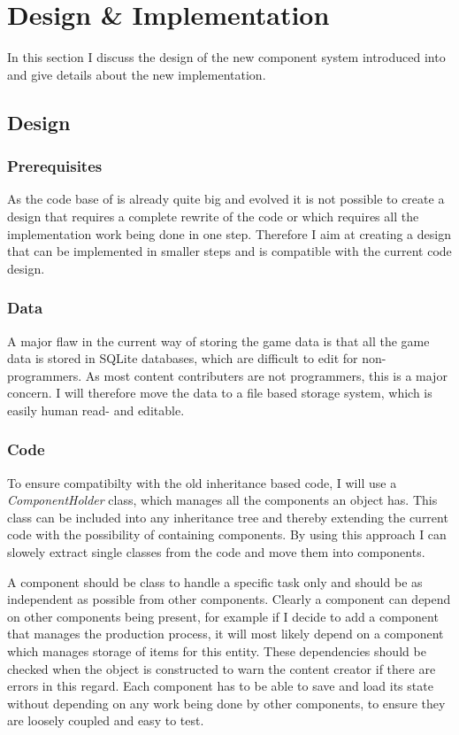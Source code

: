 \section{Design \& Implementation}
In this section I discuss the design of the new component system introduced into \UH{} and give details about the new
implementation.

\subsection{Design}

\subsubsection{Prerequisites}
As the code base of \UH{} is already quite big and evolved it is not possible to create a design that requires a
complete rewrite of the code or which requires all the implementation work being done in one step. Therefore I aim at
creating a design that can be implemented in smaller steps and is compatible with the current code design.

\subsubsection{Data}
A major flaw in the current \UH{} way of storing the game data is that all the game data is stored in SQLite databases,
which are difficult to edit for non-programmers. As most content contributers are not programmers, this is a major
concern. I will therefore move the data to a file based storage system, which is easily human read- and editable.

\subsubsection{Code}
To ensure compatibilty with the old inheritance based code, I will use a \textit{ComponentHolder} class, which manages all the
components an object has. This class can be included into any inheritance tree and thereby extending the current code
with the possibility of containing components. By using this approach I can slowely extract single classes from the code
and move them into components.

A component should be class to handle a specific task only and should be as independent
as possible from other components. Clearly a component can depend on other components being present, for example if I
decide to add a component that manages the production process, it will most likely depend on a component which manages
storage of items for this entity. These dependencies should be checked when the object is constructed to warn the
content creator if there are errors in this regard.
Each component has to be able to save and load its state without depending on any work  being done by other components,
to ensure they are loosely coupled and easy to test.

